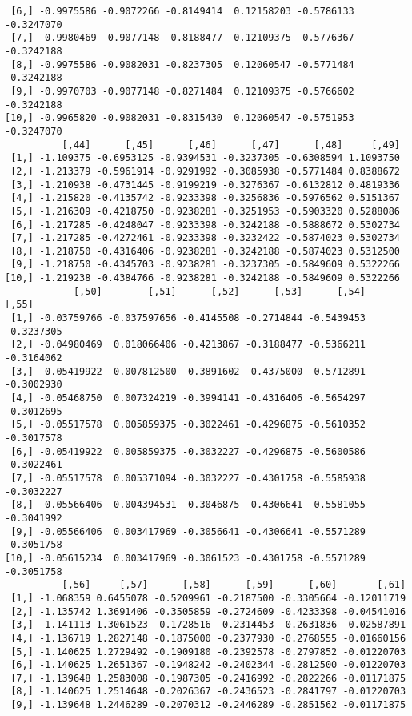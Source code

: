 \documentclass[
  letterpaper,
  DIV=11,
  numbers=noendperiod]{scrreprt}
\begin{document}
\begin{verbatim}
 [6,] -0.9975586 -0.9072266 -0.8149414  0.12158203 -0.5786133 -0.3247070
 [7,] -0.9980469 -0.9077148 -0.8188477  0.12109375 -0.5776367 -0.3242188
 [8,] -0.9975586 -0.9082031 -0.8237305  0.12060547 -0.5771484 -0.3242188
 [9,] -0.9970703 -0.9077148 -0.8271484  0.12109375 -0.5766602 -0.3242188
[10,] -0.9965820 -0.9082031 -0.8315430  0.12060547 -0.5751953 -0.3247070
          [,44]      [,45]      [,46]      [,47]      [,48]     [,49]
 [1,] -1.109375 -0.6953125 -0.9394531 -0.3237305 -0.6308594 1.1093750
 [2,] -1.213379 -0.5961914 -0.9291992 -0.3085938 -0.5771484 0.8388672
 [3,] -1.210938 -0.4731445 -0.9199219 -0.3276367 -0.6132812 0.4819336
 [4,] -1.215820 -0.4135742 -0.9233398 -0.3256836 -0.5976562 0.5151367
 [5,] -1.216309 -0.4218750 -0.9238281 -0.3251953 -0.5903320 0.5288086
 [6,] -1.217285 -0.4248047 -0.9233398 -0.3242188 -0.5888672 0.5302734
 [7,] -1.217285 -0.4272461 -0.9233398 -0.3232422 -0.5874023 0.5302734
 [8,] -1.218750 -0.4316406 -0.9238281 -0.3242188 -0.5874023 0.5312500
 [9,] -1.218750 -0.4345703 -0.9238281 -0.3237305 -0.5849609 0.5322266
[10,] -1.219238 -0.4384766 -0.9238281 -0.3242188 -0.5849609 0.5322266
            [,50]        [,51]      [,52]      [,53]      [,54]      [,55]
 [1,] -0.03759766 -0.037597656 -0.4145508 -0.2714844 -0.5439453 -0.3237305
 [2,] -0.04980469  0.018066406 -0.4213867 -0.3188477 -0.5366211 -0.3164062
 [3,] -0.05419922  0.007812500 -0.3891602 -0.4375000 -0.5712891 -0.3002930
 [4,] -0.05468750  0.007324219 -0.3994141 -0.4316406 -0.5654297 -0.3012695
 [5,] -0.05517578  0.005859375 -0.3022461 -0.4296875 -0.5610352 -0.3017578
 [6,] -0.05419922  0.005859375 -0.3032227 -0.4296875 -0.5600586 -0.3022461
 [7,] -0.05517578  0.005371094 -0.3032227 -0.4301758 -0.5585938 -0.3032227
 [8,] -0.05566406  0.004394531 -0.3046875 -0.4306641 -0.5581055 -0.3041992
 [9,] -0.05566406  0.003417969 -0.3056641 -0.4306641 -0.5571289 -0.3051758
[10,] -0.05615234  0.003417969 -0.3061523 -0.4301758 -0.5571289 -0.3051758
          [,56]     [,57]      [,58]      [,59]      [,60]       [,61]
 [1,] -1.068359 0.6455078 -0.5209961 -0.2187500 -0.3305664 -0.12011719
 [2,] -1.135742 1.3691406 -0.3505859 -0.2724609 -0.4233398 -0.04541016
 [3,] -1.141113 1.3061523 -0.1728516 -0.2314453 -0.2631836 -0.02587891
 [4,] -1.136719 1.2827148 -0.1875000 -0.2377930 -0.2768555 -0.01660156
 [5,] -1.140625 1.2729492 -0.1909180 -0.2392578 -0.2797852 -0.01220703
 [6,] -1.140625 1.2651367 -0.1948242 -0.2402344 -0.2812500 -0.01220703
 [7,] -1.139648 1.2583008 -0.1987305 -0.2416992 -0.2822266 -0.01171875
 [8,] -1.140625 1.2514648 -0.2026367 -0.2436523 -0.2841797 -0.01220703
 [9,] -1.139648 1.2446289 -0.2070312 -0.2446289 -0.2851562 -0.01171875

\end{verbatim}
\end{document}
